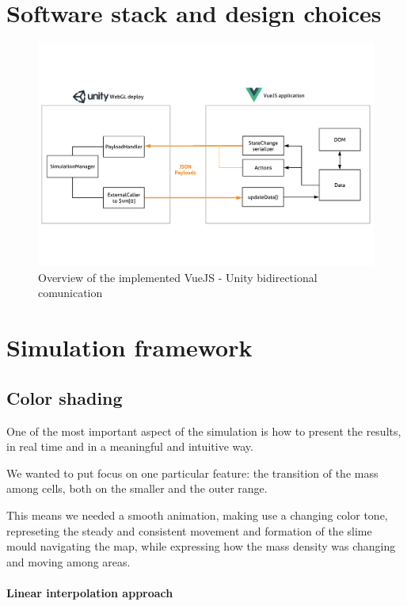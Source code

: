\section{Software stack and design choices}

\begin{figure}
  \centering
    \includegraphics[width=1\textwidth]{sw_arch}%
    
  \caption{Overview of the implemented VueJS - Unity bidirectional comunication}
  \label{fig:swstack1}
\end{figure}


\section{Simulation framework}


\subsection{Color shading}

One of the most important aspect of the simulation is how to present the results, in real time and in a meaningful and intuitive way. 

We wanted to put focus on one particular feature: the transition of the mass among cells, both on the smaller and the outer range.

This means we needed a smooth animation, making use a changing color tone, represeting the steady and consistent movement and formation of the slime mould navigating the map, while expressing how the mass density was changing and moving among areas.

\paragraph{Linear interpolation approach}

